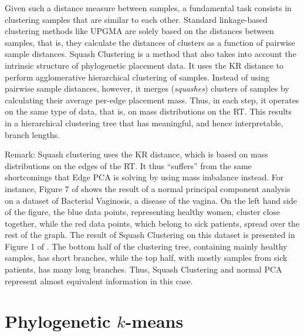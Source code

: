 Given such a distance measure between samples,
a fundamental task consists in clustering samples that are similar to each other.
Standard linkage-based clustering methods like \mbox{UPGMA} %
\cite{Michener1957,Sokal1958,Legendre1998} are solely based on the distances between samples,
that is, they calculate the distances of clusters as a function of pairwise sample distances.
Squash Clustering \cite{Matsen2011a,Srinivasan2012} is a method that
also takes into account the intrinsic structure of phylogenetic placement data.
It uses the KR distance to perform agglomerative hierarchical clustering of samples.
Instead of using pairwise sample distances, however,
it merges (\emph{squashes}) clusters of samples by calculating their average per-edge placement mass.
Thus, in each step, it operates on the same type of data, that is, on mass distributions on the \ac{RT}.
This results in a hierarchical clustering tree that has meaningful, and hence interpretable, branch lengths.

Remark:
Squash clustering uses the KR distance, which is based on mass distributions on the edges of the \ac{RT}.
It thus ``suffers'' from the same shortcomings that Edge PCA is solving by using mass imbalance instead.
For instance, Figure 7 of \cite{Matsen2011a} shows the result of a normal principal component analysis
on a dataset of Bacterial Vaginosis, a disease of the vagina.
On the left hand side of the figure, the blue data points, representing healthy women, cluster close together,
while the red data points, which belong to sick patients, spread over the rest of the graph.
The result of Squash Clustering on this dataset is presented in Figure 1 of \cite{Srinivasan2012}.
The bottom half of the clustering tree, containing mainly healthy samples, has short branches,
while the top half, with mostly samples from sick patients, has many long branches.
Thus, Squash Clustering and normal PCA represent almost equivalent information in this case.


\section{Phylogenetic \texorpdfstring{$k$-means}{k-means}}
\label{ch:Clustering:sec:PhylogeneticKmeans}


